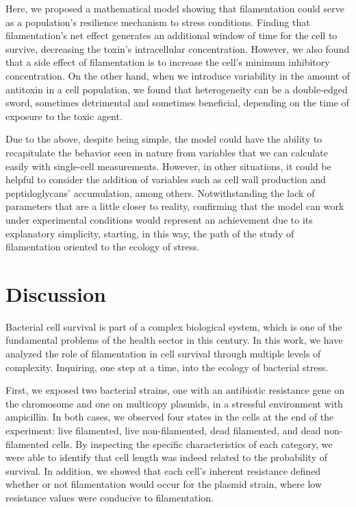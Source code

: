 \documentclass[
  12pt,
  a4paper,
  oneside]{krantz}
\begin{document}
Here, we proposed a mathematical model showing that filamentation could
serve as a population's resilience mechanism to stress conditions.
Finding that filamentation's net effect generates an additional window
of time for the cell to survive, decreasing the toxin's intracellular
concentration. However, we also found that a side effect of
filamentation is to increase the cell's minimum inhibitory
concentration. On the other hand, when we introduce variability in the
amount of antitoxin in a cell population, we found that heterogeneity
can be a double-edged sword, sometimes detrimental and sometimes
beneficial, depending on the time of exposure to the toxic agent.

Due to the above, despite being simple, the model could have the ability
to recapitulate the behavior seen in nature from variables that we can
calculate easily with single-cell measurements. However, in other
situations, it could be helpful to consider the addition of variables
such as cell wall production and peptidoglycans' accumulation, among
others. Notwithstanding the lack of parameters that are a little closer
to reality, confirming that the model can work under experimental
conditions would represent an achievement due to its explanatory
simplicity, starting, in this way, the path of the study of
filamentation oriented to the ecology of stress.

\hypertarget{general-discussion}{%
\chapter{Discussion}\label{general-discussion}}

Bacterial cell survival is part of a complex biological system, which is
one of the fundamental problems of the health sector in this century. In
this work, we have analyzed the role of filamentation in cell survival
through multiple levels of complexity. Inquiring, one step at a time,
into the ecology of bacterial stress.

First, we exposed two bacterial strains, one with an antibiotic
resistance gene on the chromosome and one on multicopy plasmids, in a
stressful environment with ampicillin. In both cases, we observed four
states in the cells at the end of the experiment: live filamented, live
non-filamented, dead filamented, and dead non-filamented cells. By
inspecting the specific characteristics of each category, we were able
to identify that cell length was indeed related to the probability of
survival. In addition, we showed that each cell's inherent resistance
defined whether or not filamentation would occur for the plasmid strain,
where low resistance values were conducive to filamentation.
\end{document}
